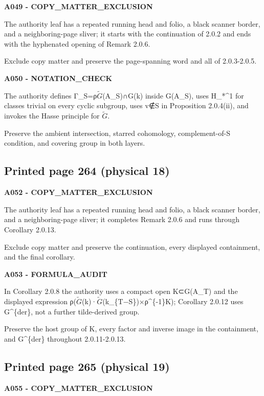 \documentclass[10pt,a4paper]{article}
\begin{document}
\textbf{A049 - COPY\_MATTER\_EXCLUSION}

The authority leaf has a repeated running head and folio, a black scanner border, and a neighboring-page sliver; it starts with the continuation of 2.0.2 and ends with the hyphenated opening of Remark 2.0.6.

Exclude copy matter and preserve the page-spanning word and all of 2.0.3-2.0.5.

\textbf{A050 - NOTATION\_CHECK}

The authority defines Γ\_S=ρ\(\widetilde{G}\)(A\_S)∩G(k) inside G(A\_S), uses H\_*\^{}1 for classes trivial on every cyclic subgroup, uses v∉S in Proposition 2.0.4(ii), and invokes the Hasse principle for \(\widetilde{G}\).

Preserve the ambient intersection, starred cohomology, complement-of-S condition, and covering group in both layers.

\subsection{Printed page 264 (physical 18)}

\textbf{A052 - COPY\_MATTER\_EXCLUSION}

The authority leaf has a repeated running head and folio, a black scanner border, and a neighboring-page sliver; it completes Remark 2.0.6 and runs through Corollary 2.0.13.

Exclude copy matter and preserve the continuation, every displayed containment, and the final corollary.

\textbf{A053 - FORMULA\_AUDIT}

In Corollary 2.0.8 the authority uses a compact open K⊂G(A\_T) and the displayed expression ρ(\(\widetilde{G}\)(k)·\(\widetilde{G}\)(k\_\{T−S\})×ρ\^{}\{-1\}K); Corollary 2.0.12 uses G\^{}\{der\}, not a further tilde-derived group.

Preserve the host group of K, every factor and inverse image in the containment, and G\^{}\{der\} throughout 2.0.11-2.0.13.

\subsection{Printed page 265 (physical 19)}

\textbf{A055 - COPY\_MATTER\_EXCLUSION}
\end{document}
